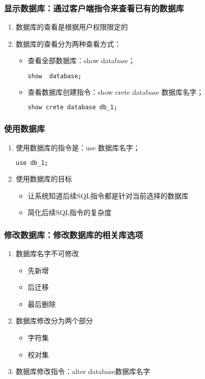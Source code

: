 \subsubsection{显示数据库：通过客户端指令来查看已有的数据库}
\begin{enumerate}
\item 数据库的查看是根据用户权限限定的
\item 数据库的查看分为两种查看方式：
\begin{itemize}
\item 查看全部数据库：show database；
\begin{lstlisting}[language=bash]
show  database;
\end{lstlisting}
\item 查看数据库创建指令：show crete database 数据库名字；
\begin{lstlisting}[language=bash]
show crete database db_1;
\end{lstlisting}
\end{itemize}

\end{enumerate}


\subsubsection{使用数据库}
\begin{enumerate}
\item 使用数据库的指令是：use 数据库名字；
\begin{lstlisting}[language=bash]
use db_1;
\end{lstlisting}
\item 使用数据库的目标
\begin{itemize}
\item 让系统知道后续SQL指令都是针对当前选择的数据库
\item  简化后续SQL指令的复杂度
\end{itemize}

\end{enumerate}

\subsubsection{修改数据库：修改数据库的相关库选项}
\begin{enumerate}
\item 数据库名字不可修改
\begin{itemize}
\item 先新增
\item 后迁移
\item 最后删除
\end{itemize}
\item 数据库修改分为两个部分
\begin{itemize}
\item 字符集
\item 校对集
\end{itemize}
\item 数据库修改指令：alter database数据库名字
\end{enumerate}
